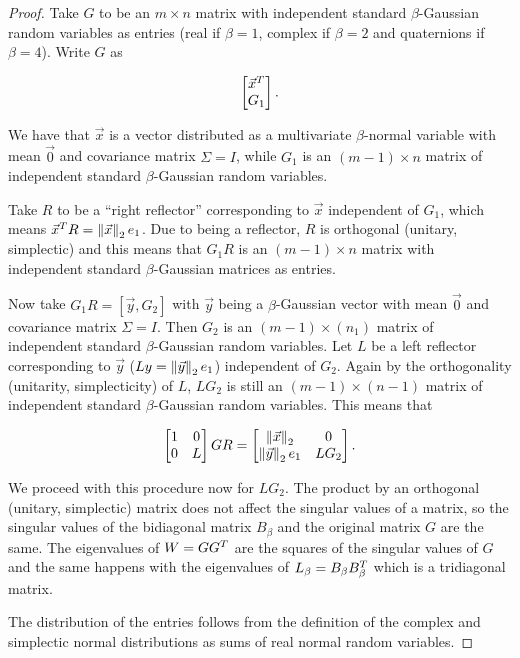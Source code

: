 \begin{proof}
    Take $G$ to be an $m\times n$ matrix with independent standard $\beta$-Gaussian random variables as entries (real if $\beta=1$, complex if $\beta=2$ and quaternions if $\beta=4$). Write $G$ as 

    \begin{equation*}
        \begin{bmatrix}
            \vec x^T\\
            G_1
        \end{bmatrix}.
    \end{equation*}

    We have that $\vec x$ is a vector distributed as a multivariate $\beta$-normal variable with mean $\vec 0$ and covariance matrix $\Sigma = I$, while $G_1$ is an $(m-1)\times n$ matrix of independent standard $\beta$-Gaussian random variables. 

    Take $R$ to be a ``right reflector'' corresponding to $\vec x$ independent of $G_1$, which means $\vec x^TR = \left\lVert\vec x\right\rVert_2 e_1$. Due to being a reflector, $R$ is orthogonal (unitary, simplectic) and this means that $G_1 R$ is an $(m-1)\times n$ matrix with independent standard $\beta$-Gaussian matrices as entries.

    Now take $G_1R = [\vec y, G_2]$ with $\vec y$ being a $\beta$-Gaussian vector with mean $\vec 0$ and covariance matrix $\Sigma = I$. Then $G_2$ is an $(m-1)\times (n_1)$ matrix of independent standard $\beta$-Gaussian random variables. Let $L$ be a left reflector corresponding to $\vec y$ ($Ly = \left\lVert\vec y\right\rVert_2 e_1$) independent of $G_2$. Again by the orthogonality (unitarity, simplecticity) of $L$, $LG_2$ is still an $(m-1)\times(n-1)$ matrix of independent standard $\beta$-Gaussian random variables. This means that

    \begin{equation*}
        \begin{bmatrix}
            1 & 0 \\
            0 & L
        \end{bmatrix} G R = \begin{bmatrix}
            \left\lVert\vec x\right\rVert_2 & 0 \\
            \left\lVert\vec y\right\rVert_2 e_1 & LG_2
        \end{bmatrix}.
    \end{equation*}

    We proceed with this procedure now for $LG_2$. The product by an orthogonal (unitary, simplectic) matrix does not affect the singular values of a matrix, so the singular values of the bidiagonal matrix $B_\beta$ and the original matrix $G$ are the same. The eigenvalues of $W = GG^T$ are the squares of the singular values of $G$ and the same happens with the eigenvalues of $L_\beta = B_\beta B_\beta^T$ which is a tridiagonal matrix.

    The distribution of the entries follows from the definition of the complex and simplectic normal distributions as sums of real normal random variables.
\end{proof}


